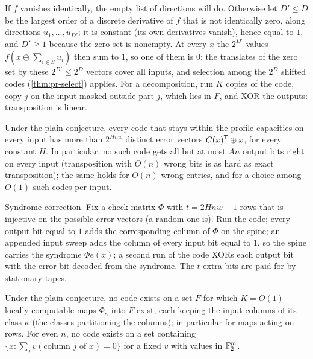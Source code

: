 \begin{outline}
If $f$ vanishes identically, the empty list of directions will do. Otherwise let $D'\le D$ be the largest order of a
discrete derivative of $f$ that is not identically zero, along directions $u_1,\dots,u_{D'}$; it is constant
(its own derivatives vanish), hence equal to $1$, and $D'\ge1$ because the zero set is nonempty. At every
$x$ the $2^{D'}$ values $f(x\oplus\sum_{i\in S}u_i)$ then sum to $1$, so one of them is $0$: the translates of
the zero set by these $2^{D'}\le2^D$ vectors cover all inputs, and selection among the $2^D$ shifted codes
(\cref{thm:pr-select}) applies.
For a decomposition, run $K$ copies of the code, copy $j$ on the input masked outside part $j$, which
lies in $F$, and XOR the outputs: transposition is linear.
\end{outline}

\begin{theorem}[Errors]\label{thm:pr-errors}
Under the plain conjecture, every code that stays within the profile capacities on every input has
more than $2^{Hnw}$ distinct error vectors $C(x)^{\mathsf{T}}\oplus x$, for every constant $H$. In particular,
no such code gets all but at most $An$ output bits right on every input (transposition with $O(n)$
wrong bits is as hard as exact transposition); the same holds for $O(n)$ wrong entries, and for a
choice among $O(1)$ such codes per input.
\end{theorem}

\begin{outline}
Syndrome correction. Fix a check matrix $\Phi$ with $t=2Hnw+1$ rows that is injective on the possible
error vectors (a random one is). Run the code; every output bit equal to $1$ adds the corresponding
column of $\Phi$ on the spine; an appended input sweep adds the column of every input bit equal to $1$,
so the spine carries the syndrome $\Phi e(x)$; a second run of the code XORs each output bit with the
error bit decoded from the syndrome. The $t$ extra bits are paid for by stationary tapes.
\end{outline}

\begin{theorem}\label{thm:pr-columns}
Under the plain conjecture, no code exists on a set $F$ for which $K=O(1)$ locally computable maps
$\Phi_\kappa$ into $F$ exist, each keeping the input columns of its class $\kappa$ (the classes
partitioning the columns); in particular for maps acting on rows. For even $n$, no code exists on a set
containing $\{x:\sum_jv(\text{column }j\text{ of }x)=0\}$ for a fixed $v$ with values in $\mathbb{F}_2^m$.
\end{theorem}

